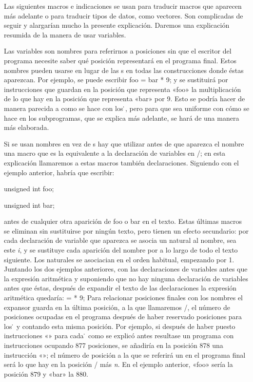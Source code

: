 Las siguientes macros e indicaciones se usan para traducir macros que aparecen más adelante o para
traducir tipos de datos, como vectores. Son complicadas de seguir y alargarían mucho la presente
explicación. Daremos una explicación resumida de la manera de usar variables.

Las variables son nombres para referirnos a posiciones sin que el escritor del programa necesite
saber qué posición representará en el programa final. Estos nombres pueden usarse en lugar de las
\zeta{}s en todas las construcciones donde éstas aparezcan. Por ejemplo, se puede
escribir
\encaje
{\fcode foo = bar * 9;}
\finencaje
y se sustituirá por instrucciones que guardan en la posición que representa «{\fcode foo}» la
multiplicación de lo que hay en la posición que representa «{\fcode bar}» por 9. Esto se podría
hacer de manera parecida a como se hace con los {\.}, pero para que sea uniforme con
cómo se hace en los subprogramas, que se explica más adelante, se hará de una manera más elaborada.

Si se usan nombres en vez de \zeta{}s hay que utilizar antes de que aparezca el nombre una macro que
es la equivalente a la declaración de variables en \C/; en esta explicación llamaremos a estas
macros también declaraciones. Siguiendo con el ejemplo anterior, habría que escribir:
\encaje
{\fcode unsigned int foo;\par {\parskip2pt unsigned int bar;}}
\finencaje
antes de cualquier otra aparición de {\fcode foo} o {\fcode bar} en el texto. Estas últimas macros
se eliminan sin sustituirse por ningún texto, pero tienen un efecto secundario: por cada declaración
de variable que aparezca se asocia un natural al nombre, sea este {\it i}, y se sustituye cada
aparición del nombre por  a lo largo de todo el texto siguiente. Los
naturales se asociacian en el orden habitual, empezando por 1. Juntando los dos ejemplos anteriores,
con las declaraciones de variables antes que la expresión aritmética y suponiendo que no hay ninguna
declaración de variables antes que éstas, después de expandir el texto de las declaraciones la expresión
aritmética quedaría:
\encaje
{\fcode {} =  * 9;}
\finencaje
Para relacionar posiciones finales con los nombres el expansor guarda en la última posición, a la
que llamaremos \top/, el número de posiciones ocupadas en el programa después de haber reservado
posiciones para los {\.} y contando esta misma posición. Por ejemplo, si después de
haber puesto instrucciones «» para cada {\.} como se explicó antes resultase
un programa con instrucciones ocupando 877 posiciones, se añadiría en la posición 878 una
instrucción «{}»; el número de posición a la que se referirá
un  en el programa final será lo que hay en la posición \top/ más {\it
n}. En el ejemplo anterior, «{\fcode foo}» sería la posición 879 y «{\fcode bar}» la 880.


